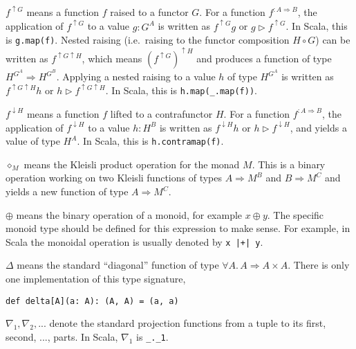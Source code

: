 $f^{\uparrow G}$ means a function $f$ raised to a functor $G$.
For a function $f^{:A\Rightarrow B}$, the application of $f^{\uparrow G}$
to a value $g:G^{A}$ is written as $f^{\uparrow G}g$ or $g\triangleright f^{\uparrow G}$.
In Scala, this is \lstinline!g.map(f)!.
Nested raising (i.e.~raising to the functor composition $H\circ G$)
can be written as $f^{\uparrow G\uparrow H}$, which means $\left(f^{\uparrow G}\right)^{\uparrow H}$
and produces a function of type $H^{G^{A}}\Rightarrow H^{G^{B}}$.
Applying a nested raising to a value $h$ of type $H^{G^{A}}$ is
written as $f^{\uparrow G\uparrow H}h$ or $h\triangleright f^{\uparrow G\uparrow H}$.
In Scala, this is \lstinline!h.map(_.map(f))!. 

$f^{\downarrow H}$ means a function $f$ lifted to a contrafunctor
$H$. For a function $f^{:A\Rightarrow B}$, the application of $f^{\downarrow H}$
to a value $h:H^{B}$ is written as $f^{\downarrow H}h$ or $h\triangleright f^{\downarrow H}$,
and yields a value of type $H^{A}$. In Scala, this is \lstinline!h.contramap(f)!.

$\diamond_{M}$ means the Kleisli product operation for the monad
$M$. This is a binary operation working on two Kleisli functions
of types $A\Rightarrow M^{B}$ and $B\Rightarrow M^{C}$ and yields
a new function of type $A\Rightarrow M^{C}$.

$\oplus$ means the binary operation of a monoid, for example $x\oplus y$.
The specific monoid type should be defined for this expression to
make sense. For example, in Scala the monoidal operation is usually
denoted by \lstinline!x |+| y!.

$\Delta$ means the standard ``diagonal'' function of type $\forall A.\,A\Rightarrow A\times A$.
There is only one implementation of this type signature,
\begin{lstlisting}
def delta[A](a: A): (A, A) = (a, a)
\end{lstlisting}
$\nabla_{1},\nabla_{2},...$ denote the standard projection functions
from a tuple to its first, second, ..., parts. In Scala, $\nabla_{1}$
is \lstinline!_._1!. 

